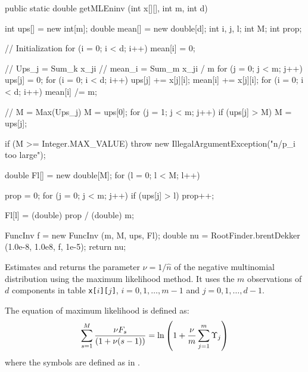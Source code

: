 \begin{code}

   public static double getMLEninv (int x[][], int m, int d)\begin{hide} {
      int ups[] = new int[m];
      double mean[] = new double[d];
      int i, j, l;
      int M;
      int prop;

      // Initialization
      for (i = 0; i < d; i++)
         mean[i] = 0;

      // Ups_j = Sum_k x_ji
      // mean_i = Sum_m x_ji / m
      for (j = 0; j < m; j++) {
         ups[j] = 0;
         for (i = 0; i < d; i++) {
            ups[j] += x[j][i];
            mean[i] += x[j][i];
         }
      }
      for (i = 0; i < d; i++)
         mean[i] /= m;

      // M = Max(Ups_j)
      M = ups[0];
      for (j = 1; j < m; j++)
         if (ups[j] > M)
            M = ups[j];

      if (M >= Integer.MAX_VALUE)
         throw new IllegalArgumentException("n/p_i too large");

      double Fl[] = new double[M];
      for (l = 0; l < M; l++) {
         prop = 0;
         for (j = 0; j < m; j++)
            if (ups[j] > l)
               prop++;

         Fl[l] = (double) prop / (double) m;
      }

      FuncInv f = new FuncInv (m, M, ups, Fl);
      double nu = RootFinder.brentDekker (1.0e-8, 1.0e8, f, 1e-5);
      return nu;
   }\end{hide}
\end{code}
\begin{tabb}
   Estimates  and returns the parameter $\nu = 1/\hat{n}$
   of the negative multinomial distribution using the maximum likelihood method.
   It uses the $m$ observations of $d$ components in table
   \texttt{x[$i$][$j$]}, $i = 0, 1, \ldots, m-1$ and $j = 0, 1, \ldots, d-1$.
   \begin{detailed}
   The equation of maximum likelihood is defined as:
   \[
      \sum_{s=1}^{M} \frac{\nu F_s}{(1 + \nu(s - 1))}  =  \ln \left(1 +
        \frac{\nu}{m} \sum_{j=1}^{m} \Upsilon_j \right)\\[8pt]
   \]
   where the symbols are defined as in .
   \end{detailed}
\end{tabb}
\begin{htmlonly}
\end{htmlonly}
